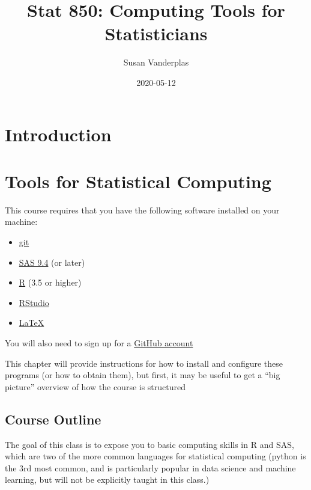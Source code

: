 \documentclass[]{book}
\title{Stat 850: Computing Tools for Statisticians}
\author{Susan Vanderplas}
\date{2020-05-12}
\providecommand{\tightlist}{%
  \setlength{\itemsep}{0pt}\setlength{\parskip}{0pt}}
\begin{document}
\maketitle

{
\setcounter{tocdepth}{1}
\tableofcontents
}
\hypertarget{introduction}{%
\chapter*{Introduction}\label{introduction}}

\hypertarget{tools}{%
\chapter{Tools for Statistical Computing}\label{tools}}

This course requires that you have the following software installed on your machine:

\begin{itemize}
\tightlist
\item
  \href{https://help.github.com/en/github/getting-started-with-github/set-up-git}{git}
\item
  \href{https://statistics.unl.edu/how-obtain-sas-or-jmp-license}{SAS 9.4} (or later)
\item
  \href{https://www.r-project.org/}{R} (3.5 or higher)
\item
  \href{https://rstudio.com/products/rstudio/download/\#download}{RStudio}
\item
  \href{https://www.latex-project.org/get/}{LaTeX}
\end{itemize}

You will also need to sign up for a \href{https://help.github.com/en/github/getting-started-with-github/signing-up-for-a-new-github-account}{GitHub account}

This chapter will provide instructions for how to install and configure these programs (or how to obtain them), but first, it may be useful to get a ``big picture'' overview of how the course is structured

\hypertarget{course-outline}{%
\section{Course Outline}\label{course-outline}}

The goal of this class is to expose you to basic computing skills in R and SAS, which are two of the more common languages for statistical computing (python is the 3rd most common, and is particularly popular in data science and machine learning, but will not be explicitly taught in this class.)
\end{document}
